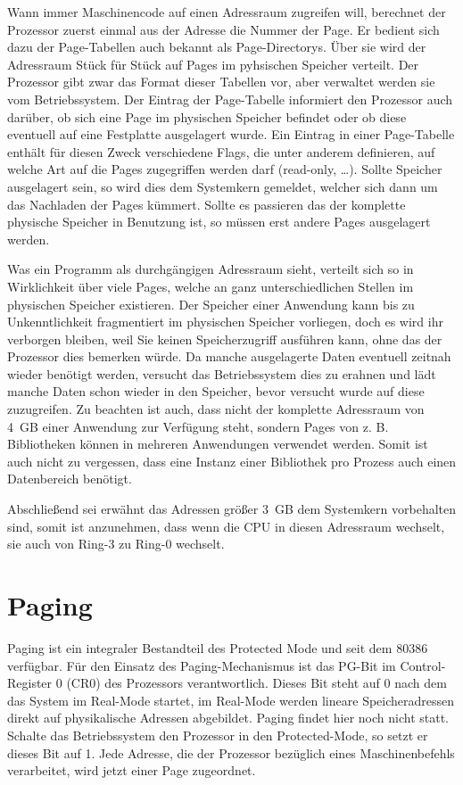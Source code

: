 \documentclass[12pt]{book}
\begin{document}
Wann immer Maschinencode auf einen Adressraum zugreifen will, berechnet der
Prozessor zuerst einmal aus der Adresse die Nummer der Page. Er bedient sich dazu
der Page-Tabellen auch bekannt als Page-Directorys. Über sie wird der
Adressraum Stück für Stück auf Pages im pyhsischen Speicher verteilt. Der
Prozessor gibt zwar das Format dieser Tabellen vor, aber verwaltet werden sie
vom Betriebssystem. Der Eintrag der Page-Tabelle informiert den Prozessor auch
darüber, ob sich eine Page im physischen Speicher befindet oder ob diese
eventuell auf eine Festplatte ausgelagert wurde. Ein Eintrag in einer
Page-Tabelle enthält für diesen Zweck verschiedene Flags, die unter anderem
definieren, auf welche Art auf die Pages zugegriffen werden darf (read-only, …).
Sollte Speicher ausgelagert sein, so wird dies dem Systemkern gemeldet, welcher
sich dann um das Nachladen der Pages kümmert. Sollte es passieren das der
komplette physische Speicher in Benutzung ist, so müssen erst andere Pages
ausgelagert werden.

Was ein Programm als durchgängigen Adressraum sieht, verteilt sich so in
Wirklichkeit über viele Pages, welche an ganz unterschiedlichen Stellen im
physischen Speicher existieren. Der Speicher einer Anwendung kann bis zu
Unkenntlichkeit fragmentiert im physischen Speicher vorliegen, doch es wird ihr
verborgen bleiben, weil Sie keinen Speicherzugriff ausführen kann, ohne das der
Prozessor dies bemerken würde. Da manche ausgelagerte Daten eventuell zeitnah
wieder benötigt werden, versucht das Betriebssystem dies zu erahnen und lädt
manche Daten schon wieder in den Speicher, bevor versucht wurde auf diese
zuzugreifen. Zu beachten ist auch, dass nicht der komplette Adressraum von 4 GB
einer Anwendung zur Verfügung steht, sondern Pages von z. B. Bibliotheken
können in mehreren Anwendungen verwendet werden. Somit ist auch nicht zu
vergessen, dass eine Instanz einer Bibliothek pro Prozess auch einen
Datenbereich benötigt.

Abschließend sei erwähnt das Adressen größer 3 GB dem Systemkern vorbehalten
sind, somit ist anzunehmen, dass wenn die CPU in diesen Adressraum wechselt, sie
auch von Ring-3 zu Ring-0 wechselt.

\section{Paging}

Paging ist ein integraler Bestandteil des Protected Mode und seit dem 80386
verfügbar. Für den Einsatz des Paging-Mechanismus ist das PG-Bit im
Control-Register 0 (CR0) des Prozessors verantwortlich. Dieses Bit steht auf 0
nach dem das System im Real-Mode startet, im Real-Mode werden lineare
Speicheradressen direkt auf physikalische Adressen abgebildet. Paging findet
hier noch nicht statt. Schalte das Betriebssystem den Prozessor in den
Protected-Mode, so setzt er dieses Bit auf 1. Jede Adresse, die der Prozessor
bezüglich eines Maschinenbefehls verarbeitet, wird jetzt einer Page zugeordnet.
\end{document}
